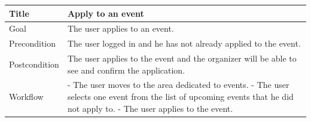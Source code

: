 \documentclass{beamer}
\begin{document}
\begin{frame}
    \begin{table}
        \tiny
        \begin{tabular}{|p{2cm}|p{6cm}|}
        \hline
        Title & \textbf{Apply to an event} \\
        \hline
        Goal & The user applies to an event. \\
        \hline
        Precondition & The user logged in and he has not already applied to the event. \\
        \hline
        Postcondition & The user applies to the event and the organizer will be able to see and confirm the application. \\
        \hline
        Workflow &
        - The user moves to the area dedicated to events. \newline
        - The user selects one event from the list of upcoming events that he did not apply to. \newline
        - The user applies to the event. \\
        \hline
        \end{tabular}
    \end{table}    
\end{frame}
\end{document}

